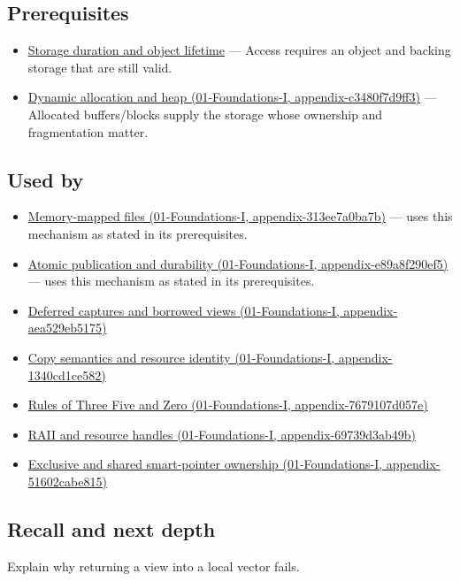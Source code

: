 \subsection{Prerequisites}\label{prerequisites}

\begin{itemize}
\tightlist
\item
  \hyperref[appendix-0b104bcba06b]{Storage duration and object lifetime} --- Access requires an object and backing storage that are still valid.
\item
  \href{}{Dynamic allocation and heap (01-Foundations-I, appendix-c3480f7d9ff3)} --- Allocated buffers/blocks supply the storage whose ownership and fragmentation matter.
\end{itemize}

\subsection{Used by}\label{used-by}

\begin{itemize}
\tightlist
\item
  \href{}{Memory-mapped files (01-Foundations-I, appendix-313ee7a0ba7b)} --- uses this mechanism as stated in its prerequisites.
\item
  \href{}{Atomic publication and durability (01-Foundations-I, appendix-e89a8f290ef5)} --- uses this mechanism as stated in its prerequisites.
\item
  \href{}{Deferred captures and borrowed views (01-Foundations-I, appendix-aea529eb5175)}
\item
  \href{}{Copy semantics and resource identity (01-Foundations-I, appendix-1340cd1ce582)}
\item
  \href{}{Rules of Three Five and Zero (01-Foundations-I, appendix-7679107d057e)}
\item
  \href{}{RAII and resource handles (01-Foundations-I, appendix-69739d3ab49b)}
\item
  \href{}{Exclusive and shared smart-pointer ownership (01-Foundations-I, appendix-51602cabe815)}
\end{itemize}

\subsection{Recall and next depth}\label{recall-and-next-depth}

Explain why returning a view into a local vector fails.

